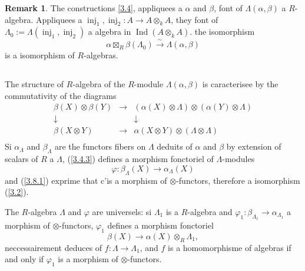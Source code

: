 \documentclass[11pt,a4paper]{article}
\theoremstyle{plain}
\theoremstyle{definition}
\newtheorem{remark}[theorem]{Remark}
\DeclareMathOperator{\Ind}{Ind}
\newcommand{\inj}{\operatorname{inj}}
\begin{document}
\begin{remark}\label{3.7}
The constructions \ref{3.4}, appliquees a $\alpha$ and $\beta$, font of $\Lambda(\alpha,\beta)$ a $R$-algebra. Appliquees a $\inj_1,\inj_2:A\to A\otimes_k A$, they font of $\Lambda_0:=\Lambda(\inj_1,\inj_2)$ a algebra in $\Ind(A\otimes_k A)$. the isomorphism
\[
\alpha\boxtimes_R\beta(\Lambda_0)\xrightarrow{\sim}\Lambda(\alpha,\beta)
\]
is a isomorphism of $R$-algebras.
\end{remark}

\subsection{}\label{3.8}

The structure of $R$-algebra of the $R$-module $\Lambda(\alpha,\beta)$ is caracterisee by the commutativity of the diagrams
\begin{equation}\label{3.8.1}
\begin{matrix}
\beta(X)\otimes\beta(Y) & \longrightarrow & (\alpha(X)\otimes\Lambda)\otimes(\alpha(Y)\otimes\Lambda)\\
\downarrow & & \downarrow\\
\beta(X\otimes Y) & \longrightarrow & \alpha(X\otimes Y)\otimes(\Lambda\otimes\Lambda)\\
\end{matrix}
\end{equation}
Si $\alpha_\Lambda$ and $\beta_\Lambda$ are the functors fibers on $\Lambda$ deduits of $\alpha$ and $\beta$ by extension of scalars of $R$ a $\Lambda$, (\ref{3.4.3}) defines a morphism fonctoriel of $\Lambda$-modules
\begin{equation}\label{3.8.2}
\varphi:\beta_\Lambda(X)\to\alpha_\Lambda(X)
\end{equation}
and (\ref{3.8.1}) exprime that c'is a morphism of $\otimes$-functors, therefore a isomorphism (\ref{3.2}).

The $R$-algebra $\Lambda$ and $\varphi$ are universels: si $\Lambda_1$ is a $R$-algebra and $\varphi_1:\beta_{\Lambda_1}\to\alpha_{\Lambda_1}$ a morphism of $\otimes$-functors, $\varphi_1$ defines a morphism fonctoriel
\[
\beta(X)\to\alpha(X)\otimes_R\Lambda_1,
\]
neccessairement deduces of $f:\Lambda\to\Lambda_1$, and $f$ is a homomorphisme of algebras if and only if $\varphi_1$ is a morphism of $\otimes$-functors.

\subsection{}\label{3.9}
\end{document}
